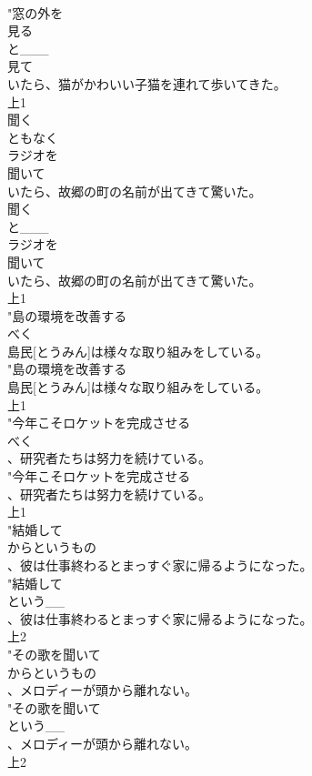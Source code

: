 \documentclass[8pt]{extreport}
\begin{document}
\begin{CJK}{UTF8}{min}
\\	"窓の外を
\\	見る
\\	と___
\\	見て
\\	いたら、猫がかわいい子猫を連れて歩いてきた。
\\	上1
\\	聞く
\\	ともなく
\\	ラジオを
\\	聞いて
\\	いたら、故郷の町の名前が出てきて驚いた。
\\	聞く
\\	と___
\\	ラジオを
\\	聞いて
\\	いたら、故郷の町の名前が出てきて驚いた。
\\	上1
\\	"島の環境を改善する
\\	べく
\\	島民[とうみん]は様々な取り組みをしている。
\\	"島の環境を改善する
\\	島民[とうみん]は様々な取り組みをしている。
\\	上1
\\	"今年こそロケットを完成させる
\\	べく
\\	、研究者たちは努力を続けている。
\\	"今年こそロケットを完成させる
\\	、研究者たちは努力を続けている。
\\	上1
\\	"結婚して
\\	からというもの
\\	、彼は仕事終わるとまっすぐ家に帰るようになった。
\\	"結婚して
\\	という__
\\	、彼は仕事終わるとまっすぐ家に帰るようになった。
\\	上2
\\	"その歌を聞いて
\\	からというもの
\\	、メロディーが頭から離れない。
\\	"その歌を聞いて
\\	という__
\\	、メロディーが頭から離れない。
\\	上2

\end{CJK}
\end{document}
